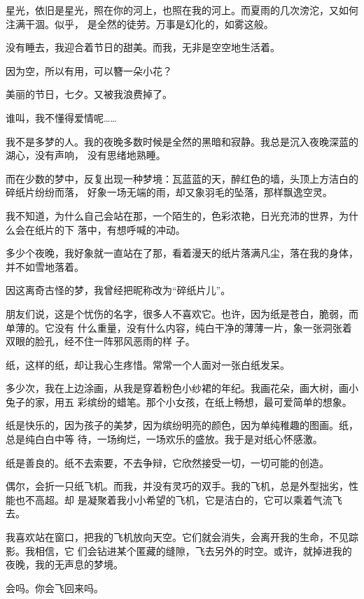 		星光，依旧是星光，照在你的河上，也照在我的河上。而夏雨的几次滂沱，又如何注满干涸。似乎，
	是全然的徒劳。万事是幻化的，如雾这般。


		没有睡去，我迎合着节日的甜美。而我，无非是空空地生活着。

		因为空，所以有用，可以簪一朵小花？

		美丽的节日，七夕。又被我浪费掉了。

		谁叫，我不懂得爱情呢……

	\endwriting



		我不是多梦的人。我的夜晚多数时候是全然的黑暗和寂静。我总是沉入夜晚深蓝的湖心，没有声响，
	没有思绪地熟睡。


		而在少数的梦中，反复出现一种梦境：瓦蓝蓝的天，醉红色的墙，头顶上方洁白的碎纸片纷纷而落，
	好象一场无端的雨，却又象羽毛的坠落，那样飘逸空灵。

		我不知道，为什么自己会站在那，一个陌生的，色彩浓艳，日光充沛的世界，为什么会在纸片的下
	落中，有想呼喊的冲动。

		多少个夜晚，我好象就一直站在了那，看着漫天的纸片落满凡尘，落在我的身体，并不如雪地落着。

		因这离奇古怪的梦，我曾经把昵称改为“碎纸片儿”。

		朋友们说，这是个忧伤的名字，很多人不喜欢它。也许，因为纸是苍白，脆弱，而单薄的。它没有
	什么重量，没有什么内容，纯白干净的薄薄一片，象一张洞张着双眼的脸孔，经不住一阵邪风恶雨的样
	子。

		纸，这样的纸，却让我心生疼惜。常常一个人面对一张白纸发呆。

		多少次，我在上边涂画，从我是穿着粉色小纱裙的年纪。我画花朵，画大树，画小兔子的家，用五
	彩缤纷的蜡笔。那个小女孩，在纸上畅想，最可爱简单的想象。

		纸是快乐的，因为孩子的美梦，因为缤纷明亮的颜色，因为单纯稚趣的图画。纸，总是纯白白中等
	待，一场绚烂，一场欢乐的盛放。我于是对纸心怀感激。


		纸是善良的。纸不去索要，不去争辩，它欣然接受一切，一切可能的创造。

		偶尔，会折一只纸飞机。而我，并没有灵巧的双手。我的飞机，总是外型拙劣，性能也不高超。却
	是凝聚着我小小希望的飞机，它是洁白的，它可以乘着气流飞去。

		我喜欢站在窗口，把我的飞机放向天空。它们就会消失，会离开我的生命，不见踪影。我相信，它
	们会钻进某个匿藏的缝隙，飞去另外的时空。或许，就掉进我的夜晚，我的无声息的梦境。

		会吗。你会飞回来吗。

